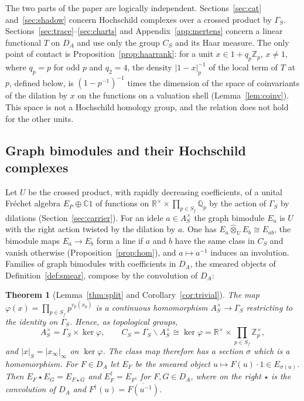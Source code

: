 \documentclass[11pt]{amsart}
\newtheorem{theorem}{Theorem}[section]
\theoremstyle{definition}
\theoremstyle{remark}
\newcommand{\C}{\mathbb C}
\newcommand{\R}{\mathbb R}
\newcommand{\Z}{\mathbb Z}
\newcommand{\Q}{\mathbb Q}
\begin{document}
The two parts of the paper are logically independent.
Sections~\ref{sec:cat} and~\ref{sec:shadow} concern Hochschild complexes over
a crossed product by $\Gamma_S$.  Sections~\ref{sec:trace}--\ref{sec:charts}
and Appendix~\ref{app:mertens} concern a linear functional $T$ on $D_A$ and
use only the group $C_S$ and its Haar measure.  The only point of contact is
Proposition~\ref{prop:haarrank}: for a unit $x\in1+q_p\Z_p$, $x\ne1$, where
$q_p=p$ for odd $p$ and $q_2=4$, the density $|1-x|_p^{-1}$ of the local term
of $T$ at $p$, defined below, is
$(1-p^{-1})^{-1}$ times the dimension of the space of coinvariants of the
dilation by $x$ on the functions on a valuation shell
(Lemma~\ref{lem:coinv}).  This space is not a Hochschild homology group, and
the relation does not hold for the other units.

\subsection*{Graph bimodules and their Hochschild complexes}

Let $U$ be the crossed product, with rapidly decreasing coefficients, of a
unital Fr\'echet algebra $E_P\oplus\C1$ of functions on
$\R^{\times}\times\prod_{p\in S_f}\Q_p$ by the action of $\Gamma_S$ by
dilations (Section~\ref{sec:carrier}).  For an idele $a\in A_S^{\times}$ the
graph bimodule $E_a$ is $U$ with the right action twisted by the dilation by
$a$.  One has $E_a\widehat\otimes_UE_b\cong E_{ab}$, the bimodule maps
$E_a\to E_b$ form a line if $a$ and $b$ have the same class in $C_S$ and
vanish otherwise (Proposition~\ref{prop:hom}), and $a\mapsto a^{-1}$ induces
an involution.  Families of graph bimodules with coefficients in $D_A$, the
smeared objects of Definition~\ref{def:smear}, compose by the convolution of
$D_A$:

\begin{theorem}[Lemma~\ref{thm:split} and
Corollary~\ref{cor:trivial}]\label{thm:introA}
The map $\varphi(x)=\prod_{p\in S_f}p^{v_p(x_p)}$ is a continuous
homomorphism $A_S^{\times}\to\Gamma_S$ restricting to the identity on
$\Gamma_S$.  Hence, as topological groups,
\[
A_S^{\times}=\Gamma_S\times\ker\varphi,\qquad
C_S=\Gamma_S\backslash A_S^{\times}\cong\ker\varphi=
\R^{\times}\times\prod_{p\in S_f}\Z_p^{\times},
\]
and $|x|_S=|x_{\infty}|_{\infty}$ on $\ker\varphi$.  The class map therefore
has a section $\sigma$ which is a homomorphism.  For $F\in D_A$ let $E_F$ be
the smeared object $u\mapsto F(u)\cdot1\in E_{\sigma(u)}$.  Then
$E_F\star E_G=E_{F\star G}$ and $E_F^{\dagger}=E_{F^{\dagger}}$ for
$F,G\in D_A$, where on the right $\star$ is the convolution of $D_A$ and
$F^{\dagger}(u)=\overline{F(u^{-1})}$.
\end{theorem}
\end{document}
